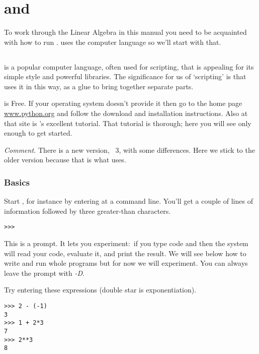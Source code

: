 \chapter{\python{} and \Sage{}}

To work through the Linear Algebra in this manual
you need to be acquainted with how to run \Sage. 
\Sage{} uses the computer language \python{} so we'll start with that.




\section{\python}
\python{} is a popular computer language, often used for scripting,
that is appealing for its simple style and powerful libraries.
The significance for us of `scripting' is that \Sage{} uses it in this way,
as a glue to bring together separate parts.

\python{} is Free.
If your operating system doesn't provide it then go to the home 
page \href{http://www.python.org}{\url{www.python.org}} and follow the
download and installation instructions.
Also at that site is \python's excellent tutorial.
That tutorial is thorough; 
here you will see only enough \python{} to get started.

\smallskip
\textit{Comment.}
There is a new version, \python~3, with some differences.
Here we stick to the older version 
because that is what \Sage{} uses.


\subsection{Basics}
Start \python, for instance by entering 
at a command line.
You'll get a couple of lines of 
information followed by three greater-than
characters.
\begin{lstlisting}[style=python]
>>>   
\end{lstlisting}
This is a prompt.
It lets you experiment:~if you type 
\python{} code and  then the system
will read your code, evaluate it, and print the result.
We will see below how to write and run whole programs
but for now we will experiment.
You can always leave the prompt with \textit{-D}.

Try entering these expressions (double star is exponentiation).
\begin{lstlisting}[style=python]
>>> 2 - (-1)
3
>>> 1 + 2*3
7
>>> 2**3
8  
\end{lstlisting}


